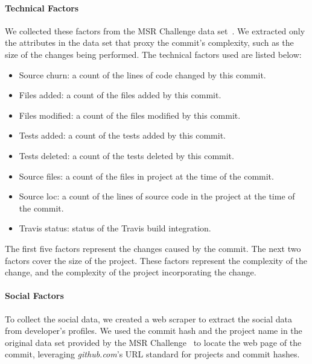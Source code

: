 \documentclass[10pt, conference]{IEEEtran}
\begin{document}
\paragraph{Technical Factors} We collected these factors from the 
MSR Challenge data set~\cite{msr17challenge}.
We extracted only the attributes in the data set that proxy the commit's
complexity, such as the size of the changes being performed.  
The technical
factors used are listed below:
\begin{itemize}
\item Source churn: a count of the lines of code changed by this commit.
\item Files added: a count of the files added by this commit.
\item Files modified: a count of the files modified by this commit.
\item Tests added: a count of the tests added by this commit.
\item Tests deleted: a count of the tests deleted by this commit.
\item Source files: a count of the files in project at the time of the commit.
\item Source loc: a count of the lines of source code in the project at
	the time of the commit.
\item Travis status: status of the Travis build integration.
\end{itemize}

The first five factors represent the changes caused by the commit.  The next two
factors cover the size of the project.  These factors represent the complexity
of the change, and the complexity of the project incorporating the change. 

\paragraph{Social Factors} To collect the social data, we created a web scraper to extract the social data
from developer's profiles.
We used the commit hash and the project name in the original data
set provided by the MSR Challenge~\cite{msr17challenge} to locate the web page
of the commit, leveraging \textit{github.com}'s URL standard for projects and
commit hashes.
\end{document}

